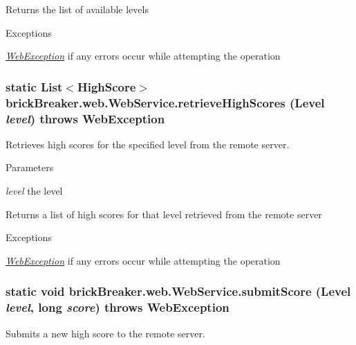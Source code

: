 \begin{DoxyReturn}{Returns}
the list of available levels
\end{DoxyReturn}

\begin{DoxyExceptions}{Exceptions}
\item[{\em \hyperlink{classbrick_breaker_1_1web_1_1_web_exception}{WebException}}]if any errors occur while attempting the operation \end{DoxyExceptions}
\hypertarget{classbrick_breaker_1_1web_1_1_web_service_a4dd0376683c3179b7bb6ff169833e5e6}{
\subsubsection[{retrieveHighScores}]{\setlength{\rightskip}{0pt plus 5cm}static List$<${\bf HighScore}$>$ brickBreaker.web.WebService.retrieveHighScores ({\bf Level} {\em level})  throws {\bf WebException} }}
\label{classbrick_breaker_1_1web_1_1_web_service_a4dd0376683c3179b7bb6ff169833e5e6}
Retrieves high scores for the specified level from the remote server.


\begin{DoxyParams}{Parameters}
\item[{\em level}]the level \end{DoxyParams}
\begin{DoxyReturn}{Returns}
a list of high scores for that level retrieved from the remote server
\end{DoxyReturn}

\begin{DoxyExceptions}{Exceptions}
\item[{\em \hyperlink{classbrick_breaker_1_1web_1_1_web_exception}{WebException}}]if any errors occur while attempting the operation \end{DoxyExceptions}
\hypertarget{classbrick_breaker_1_1web_1_1_web_service_a518c7c9660da1e22973ec62effaf6c70}{
\subsubsection[{submitScore}]{\setlength{\rightskip}{0pt plus 5cm}static void brickBreaker.web.WebService.submitScore ({\bf Level} {\em level}, \/  long {\em score})  throws {\bf WebException} }}
\label{classbrick_breaker_1_1web_1_1_web_service_a518c7c9660da1e22973ec62effaf6c70}
Submits a new high score to the remote server.


